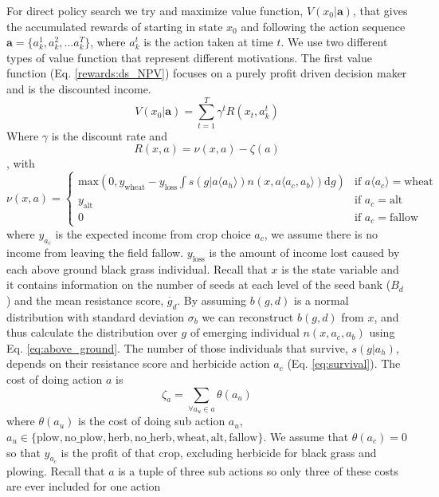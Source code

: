 \documentclass[12pt, a4paper]{article}
\begin{document}
For direct policy search we try and maximize value function, $V(x_0|\mathbf{a})$, that gives the accumulated rewards of starting in state $x_0$ and following the action sequence $\mathbf{a} = \{a_k^1, a_k^2, ... a_k^T\}$, where $a_k^t$ is the action taken at time $t$. We use two different types of value function that represent different motivations. The first value function (Eq. \ref{rewards:ds_NPV}) focuses on a purely profit driven decision maker and is the discounted income. 
\begin{equation}\label{rewards:ds_NPV}
	V(x_0|\mathbf{a}) = \sum_{t = 1}^{T} \gamma^t R(x_t, a_k^t) 
\end{equation}
Where $\gamma$ is the discount rate and 
\begin{equation}\label{rewards:immediate}
	R(x, a) = \nu(x, a) - \zeta(a)  
\end{equation},
with
\begin{equation}
	\nu(x, a) = \begin{cases}
		\text{max}(0, y_\text{wheat} - y_\text{loss}\int s(g|a\langle a_h \rangle)n(x, a\langle a_c, a_b \rangle)\text{d}g) &\text{if } a\langle a_c \rangle = \text{wheat}\\
		y_\text{alt} &\text{if } a_c = \text{alt}\\
		0 &\text{if } a_c = \text{fallow} 
	\end{cases}
\end{equation}
where $y_{a_c}$ is the expected income from crop choice $a_c$, we assume there is no income from leaving the field fallow. $y_\text{loss}$ is the amount of income lost caused by each above ground black grass individual. Recall that $x$ is the state variable and it contains information on the number of seeds at each level of the seed bank ($B_d$) and the mean resistance score, $\overline{g}_d$. By assuming $b(g, d)$ is a normal distribution with standard deviation $\sigma_b$ we can reconstruct $b(g, d)$ from $x$, and thus calculate the distribution over $g$ of emerging individual $n(x, a_c, a_b)$ using Eq. \ref{eq:above_ground}. The number of those individuals that survive, $s(g|a_h)$, depends on their resistance score and herbicide action $a_c$ (Eq. \ref{eq:survival}). The cost of doing action $a$ is
\begin{equation}
	\zeta_{a} = \sum_{\forall a_u \in a} \theta(a_u)
\end{equation} 
where $\theta(a_u)$ is the cost of doing sub action $a_u$, $a_u \in \{\text{plow}, \text{no\_plow}, \text{herb}, \text{no\_herb}, \text{wheat}, \text{alt}, \text{fallow}\}$. We assume that $\theta(a_c) = 0$ so that $y_{a_c}$ is the profit of that crop, excluding herbicide for black grass and plowing. Recall that $a$ is a tuple of three sub actions so only three of these costs are ever included for one action     
\end{document}
